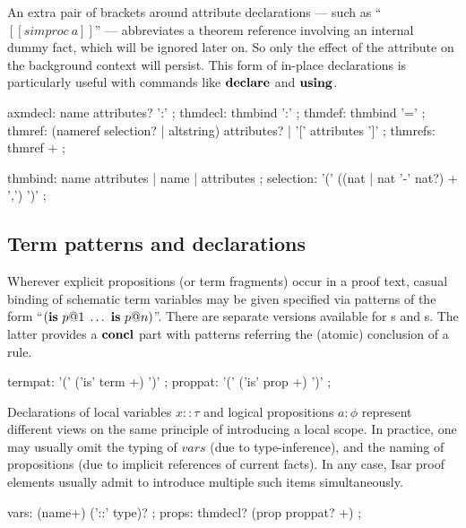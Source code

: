 An extra pair of brackets around attribute declarations --- such as
``$[[simproc~a]]$'' --- abbreviates a theorem reference involving an
internal dummy fact, which will be ignored later on.  So only the
effect of the attribute on the background context will persist.  This
form of in-place declarations is particularly useful with commands
like ${\mathord{\mathbf{declare}}}$ and ${\mathord{\mathbf{using}}}$.

\begin{rail}
  axmdecl: name attributes? ':'
  ;
  thmdecl: thmbind ':'
  ;
  thmdef: thmbind '='
  ;
  thmref: (nameref selection? | altstring) attributes? | '[' attributes ']'
  ;
  thmrefs: thmref +
  ;

  thmbind: name attributes | name | attributes
  ;
  selection: '(' ((nat | nat '-' nat?) + ',') ')'
  ;
\end{rail}


\subsection{Term patterns and declarations}\label{sec:term-decls}

Wherever explicit propositions (or term fragments) occur in a proof text,
casual binding of schematic term variables may be given specified via patterns
of the form ``$({\mathord{\mathbf{is}}}~p@1\;\dots~{\mathord{\mathbf{is}}}~p@n)$''.  There are separate versions
available for s and s.  The latter provides a
${\mathord{\mathbf{concl}}}$ part with patterns referring the (atomic) conclusion of a rule.

\begin{rail}
  termpat: '(' ('is' term +) ')'
  ;
  proppat: '(' ('is' prop +) ')'
  ;
\end{rail}

Declarations of local variables $x :: \tau$ and logical propositions $a :
\phi$ represent different views on the same principle of introducing a local
scope.  In practice, one may usually omit the typing of $vars$ (due to
type-inference), and the naming of propositions (due to implicit references of
current facts).  In any case, Isar proof elements usually admit to introduce
multiple such items simultaneously.

\begin{rail}
  vars: (name+) ('::' type)?
  ;
  props: thmdecl? (prop proppat? +)
  ;
\end{rail}


